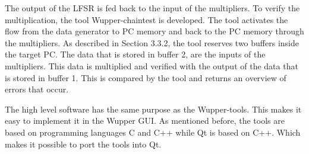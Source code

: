 The output of the LFSR is fed back to the input of the multipliers. To verify the multiplication, the tool Wupper-chaintest is developed. The tool activates the flow from the data generator to PC memory and back to the PC memory through the multipliers. As described in Section 3.3.2, the tool reserves two buffers inside the target PC. The data that is stored in buffer 2, are the inputs of the multipliers. This data is multiplied and verified with the output of the data that is stored in buffer 1. This is compared by the tool and returns an overview of errors that occur.

The high level software has the same purpose as the Wupper-tools. This makes it easy to implement it in the Wupper GUI. As mentioned before, the tools are based on programming languages C and C++ while Qt is based on C++. Which makes it possible to port the tools into Qt.

 
 
 
 \newpage